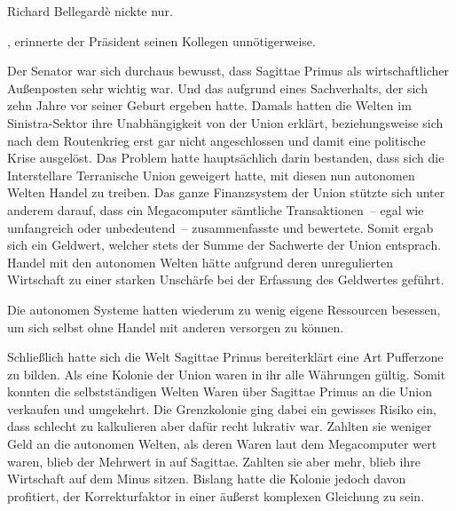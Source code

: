 \par

Richard Bellegardè nickte nur. 

\par

, erinnerte der Präsident seinen Kollegen unnötigerweise. 

\par

Der Senator war sich durchaus bewusst, dass Sagittae Primus als wirtschaftlicher Außenposten sehr wichtig war. Und das aufgrund eines Sachverhalts, der sich zehn Jahre vor seiner Geburt ergeben hatte. Damals hatten die Welten im Sinistra-Sektor ihre Unabhängigkeit von der Union erklärt, beziehungsweise sich nach dem Routenkrieg erst gar nicht angeschlossen und damit eine politische Krise ausgelöst. Das Problem hatte hauptsächlich darin bestanden, dass sich die Interstellare Terranische Union geweigert hatte, mit diesen nun autonomen Welten Handel zu treiben. Das ganze Finanzsystem der Union stützte sich unter anderem darauf, dass ein Megacomputer sämtliche Transaktionen~-- egal wie umfangreich oder unbedeutend~-- zusammenfasste und bewertete. Somit ergab sich ein Geldwert, welcher stets der Summe der Sachwerte der Union entsprach. Handel mit den autonomen Welten hätte aufgrund deren unregulierten Wirtschaft zu einer starken Unschärfe bei der Erfassung des Geldwertes geführt.

\par

Die autonomen Systeme hatten wiederum zu wenig eigene Ressourcen besessen, um sich selbst ohne Handel mit anderen versorgen zu können.

\par

Schließlich hatte sich die Welt Sagittae Primus bereiterklärt eine Art Pufferzone zu bilden. Als eine Kolonie der Union waren in ihr alle Währungen gültig. Somit konnten die selbstständigen Welten Waren über Sagittae Primus an die Union verkaufen und umgekehrt. Die Grenzkolonie ging dabei ein gewisses Risiko ein, dass schlecht zu kalkulieren aber dafür recht lukrativ war. Zahlten sie weniger Geld an die autonomen Welten, als deren Waren laut dem Megacomputer  wert waren, blieb der Mehrwert in auf Sagittae. Zahlten sie aber mehr, blieb ihre Wirtschaft auf dem Minus sitzen. Bislang hatte die Kolonie jedoch davon profitiert, der Korrekturfaktor in einer äußerst komplexen Gleichung zu sein.

